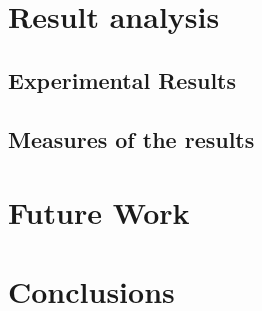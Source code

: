 \documentclass{acm_proc_article-sp}
\begin{document}
\section{Result analysis}

\subsection{Experimental Results}

\subsection{Measures of the results}


\section{Future Work}


\section{Conclusions}
\end{document}
